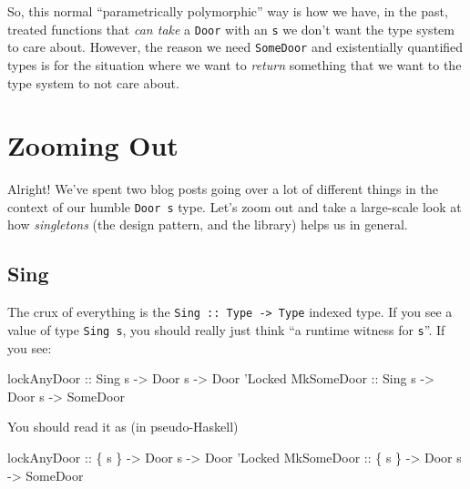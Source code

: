 \documentclass[]{article}
\newenvironment{Shaded}{}{}
\newcommand{\DataTypeTok}[1]{\textcolor[rgb]{0.56,0.13,0.00}{#1}}
\newcommand{\CharTok}[1]{\textcolor[rgb]{0.25,0.44,0.63}{#1}}
\newcommand{\OtherTok}[1]{\textcolor[rgb]{0.00,0.44,0.13}{#1}}
\newcommand{\NormalTok}[1]{#1}
\begin{document}
So, this normal ``parametrically polymorphic'' way is how we have, in the past,
treated functions that \emph{can take} a \texttt{Door} with an \texttt{s} we
don't want the type system to care about. However, the reason we need
\texttt{SomeDoor} and existentially quantified types is for the situation where
we want to \emph{return} something that we want to the type system to not care
about.

\section{Zooming Out}\label{zooming-out}

Alright! We've spent two blog posts going over a lot of different things in the
context of our humble \texttt{Door\ s} type. Let's zoom out and take a
large-scale look at how \emph{singletons} (the design pattern, and the library)
helps us in general.

\subsection{Sing}\label{sing}

The crux of everything is the \texttt{Sing\ ::\ Type\ -\textgreater{}\ Type}
indexed type. If you see a value of type \texttt{Sing\ s}, you should really
just think ``a runtime witness for \texttt{s}''. If you see:

\begin{Shaded}
\begin{Highlighting}[]
\OtherTok{lockAnyDoor ::} \DataTypeTok{Sing}\NormalTok{ s }\OtherTok{->} \DataTypeTok{Door}\NormalTok{ s }\OtherTok{->} \DataTypeTok{Door} \CharTok{'Locked}
\DataTypeTok{MkSomeDoor}\OtherTok{  ::} \DataTypeTok{Sing}\NormalTok{ s }\OtherTok{->} \DataTypeTok{Door}\NormalTok{ s }\OtherTok{->} \DataTypeTok{SomeDoor}
\end{Highlighting}
\end{Shaded}

You should read it as (in pseudo-Haskell)

\begin{Shaded}
\begin{Highlighting}[]
\OtherTok{lockAnyDoor ::}\NormalTok{ \{ s \} }\OtherTok{->} \DataTypeTok{Door}\NormalTok{ s }\OtherTok{->} \DataTypeTok{Door} \CharTok{'Locked}
\DataTypeTok{MkSomeDoor}\OtherTok{  ::}\NormalTok{ \{ s \} }\OtherTok{->} \DataTypeTok{Door}\NormalTok{ s }\OtherTok{->} \DataTypeTok{SomeDoor}
\end{Highlighting}
\end{Shaded}
\end{document}
